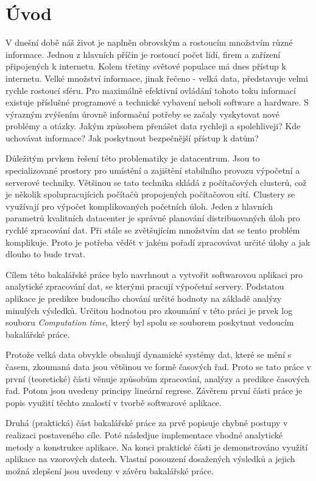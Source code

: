 \documentclass[a4paper,12pt,twoside]{scrreprt}
\begin{document}
\chapter*{Úvod}

V dnešní době náš život je naplněn obrovským a rostoucím množstvím různé informace. Jednou z hlavních příčin je rostoucí počet lidí, firem a zařízení připojených k internetu. Kolem třetiny světové populace má dnes přístup k internetu. Velké množství informace, jinak řečeno - velká data, představuje velmi rychle rostoucí sféru. Pro maximálně efektivní ovládání tohoto toku informací existuje příslušné programové a technické vybavení neboli software a hardware. S výrazným zvýšením úrovně informační potřeby se začaly vyskytovat nové problémy a otázky. Jakým způsobem přenášet data rychleji a spolehliveji? Kde uchovávat informace? Jak poskytnout bezpečnější přístup k datům?

Důležitým prvkem řešení této problematiky je datacentrum. Jsou to specializované prostory pro umístění a zajištění stabilního provozu výpočetní a serverové techniky. Většinou se tato technika skládá z počítačových clusterů, což je několik spolupracujícich počítačů propojených počítačovou sítí. Clustery se využívají pro výpočet komplikovaných početních úloh. Jeden z hlavních parametrů kvalitních datacenter je správné planování distribuovaných úloh pro rychlé zpracování dat. Při stále se zvětšujícím množstvím dat se tento problém komplikuje. Proto je potřeba vědět v jakém pořadí zpracovávat určité úlohy a jak dlouho to bude trvat. 

Cílem této bakalářské práce bylo navrhnout a vytvořit softwarovou aplikaci pro analytické zpracování dat, se kterými pracují výpočetní servery. Podstatou aplikace je predikce budoucího chování určité hodnoty na základě analýzy minulých výsledků. Určitou hodnotou pro zkoumání v této práci je prvek log souboru \textit{Computation time}, který byl spolu se souborem poskytnut vedoucím bakalářské práce. 

Protože velká data obvykle obsahují dynamické systémy dat, které se mění s časem, zkoumaná data jsou většinou ve formě časových řad. Proto se tato práce v první (teoretické) části věnuje způsobům zpracování, analýzy a predikce časových řad. Potom jsou uvedeny principy lineární regrese. Závěrem první části práce je popis využití těchto znalostí v tvorbě softwarové aplikace. 

Druhá (praktická) část bakalářské práce za prvé popisuje chybné postupy v realizaci postaveného cíle. Poté následjue implementace vhodné analytické metody a konstrukce aplikace. Na konci praktické části je demonstrováno využití aplikace na vzorových datech. Vlastní posouzení dosažených výsledků a jejich možná zlepšení jsou uvedeny v závěru bakalářské práce.
\end{document}
